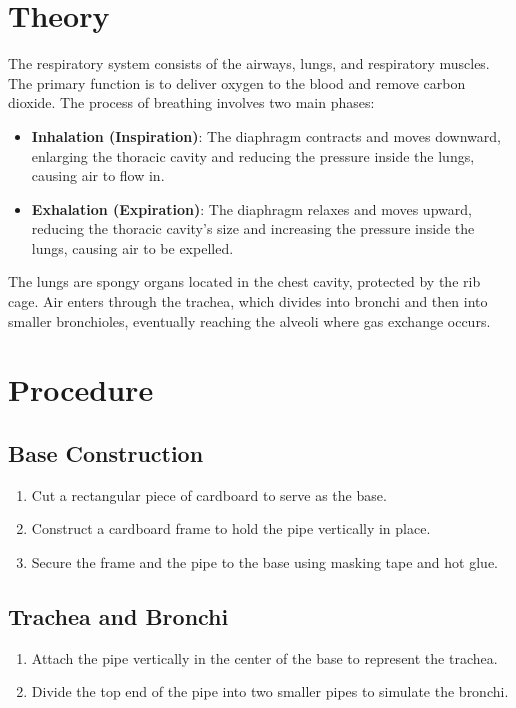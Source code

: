 \documentclass[12pt]{article}
\begin{document}
\section{Theory}
The respiratory system consists of the airways, lungs, and respiratory muscles. The primary function is to deliver oxygen to the blood and remove carbon dioxide. The process of breathing involves two main phases:
\begin{itemize}
    \item \textbf{Inhalation (Inspiration)}: The diaphragm contracts and moves downward, enlarging the thoracic cavity and reducing the pressure inside the lungs, causing air to flow in.
    \item \textbf{Exhalation (Expiration)}: The diaphragm relaxes and moves upward, reducing the thoracic cavity's size and increasing the pressure inside the lungs, causing air to be expelled.
\end{itemize}
The lungs are spongy organs located in the chest cavity, protected by the rib cage. Air enters through the trachea, which divides into bronchi and then into smaller bronchioles, eventually reaching the alveoli where gas exchange occurs.

\section{Procedure}

\subsection{Base Construction}
\begin{enumerate}
    \item Cut a rectangular piece of cardboard to serve as the base.
    \item Construct a cardboard frame to hold the pipe vertically in place.
    \item Secure the frame and the pipe to the base using masking tape and hot glue.
\end{enumerate}

\subsection{Trachea and Bronchi}
\begin{enumerate}
    \item Attach the pipe vertically in the center of the base to represent the trachea.
    \item Divide the top end of the pipe into two smaller pipes to simulate the bronchi.
\end{enumerate}
\end{document}
